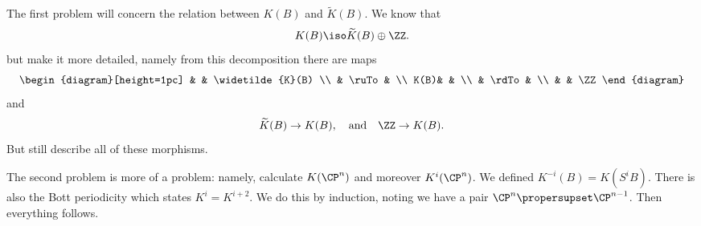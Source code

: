 The first problem will concern the relation between
$K(B)$ and
$\widetilde{K}(B)$. We know that 
\begin{equation}
K(B)\iso\widetilde{K}(B)\oplus\ZZ.
\end{equation}
but make it more detailed, namely from this decomposition there
are maps
\begin{equation}
\begin{diagram}[height=1pc]
    &       & \widetilde{K}(B) \\
    & \ruTo & \\
K(B)&       & \\
    & \rdTo & \\
    &       & \ZZ
\end{diagram}
\end{equation}
and
\begin{equation}
\widetilde{K}(B)\to K(B),\quad\mbox{and}\quad\ZZ\to K(B).
\end{equation}
But still describe all of these morphisms.

The second problem is more of a problem: namely, calculate
$K(\CP^n)$ and moreover $K^i(\CP^n)$. We defined
$K^{-i}(B)=K(S^{i}B)$. There is also the Bott periodicity which
states $K^{i}=K^{i+2}$. We do this by induction, noting we have a
pair $\CP^n\propersupset\CP^{n-1}$. Then everything follows.

